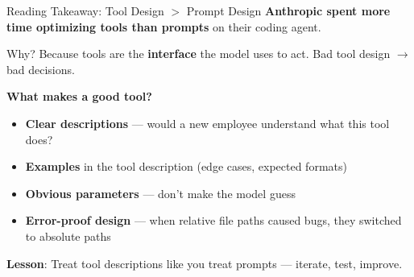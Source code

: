 \documentclass[aspectratio=169]{beamer}
\begin{document}
\begin{frame}{Reading Takeaway: Tool Design $>$ Prompt Design}
\textbf{Anthropic spent more time optimizing tools than prompts} on their coding agent.
\vspace{0.3cm}

Why? Because tools are the \textbf{interface} the model uses to act. Bad tool design $\rightarrow$ bad decisions.
\vspace{0.3cm}

\textbf{What makes a good tool?}
\begin{itemize}
    \item \textbf{Clear descriptions} --- would a new employee understand what this tool does?
    \item \textbf{Examples} in the tool description (edge cases, expected formats)
    \item \textbf{Obvious parameters} --- don't make the model guess
    \item \textbf{Error-proof design} --- when relative file paths caused bugs, they switched to absolute paths
\end{itemize}
\vspace{0.3cm}

\textbf{Lesson}: Treat tool descriptions like you treat prompts --- iterate, test, improve.
\end{frame}
\end{document}
